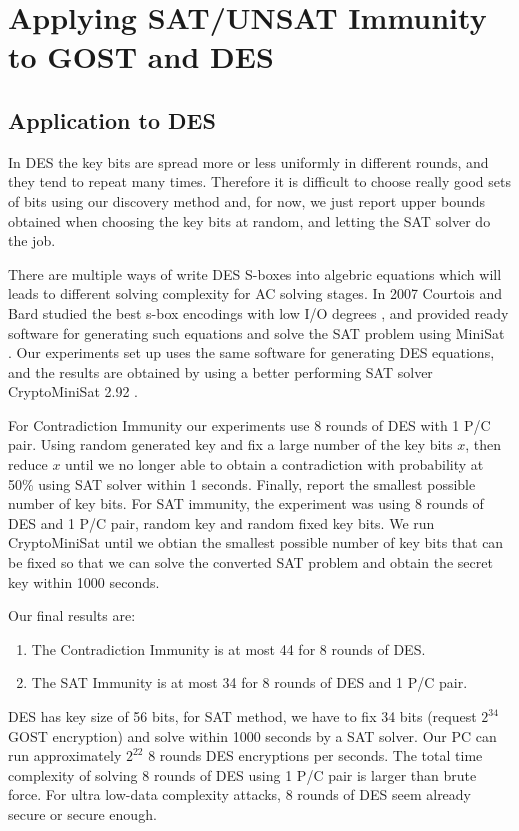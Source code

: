 \section{Applying SAT/UNSAT Immunity to GOST and DES}

\subsection{Application to DES}
 In DES the key bits are spread more or less uniformly in different rounds, and they tend to repeat many times. Therefore it is difficult to choose really good sets of bits using our discovery method and, for now, we just report upper bounds obtained when choosing
the key bits at random, and letting the SAT solver do the job. 

There are multiple ways of write DES S-boxes into algebric equations which will leads to different solving complexity for AC solving stages. In 2007 Courtois and Bard studied the best s-box encodings with low I/O degrees \cite{courtois2007algebraicDES}, and provided ready software for generating such equations and solve the SAT problem using MiniSat \cite{minisat}. Our experiments set up uses the same software for generating DES equations, and the results are obtained by using a better performing SAT solver CryptoMiniSat 2.92 \cite{CryptoMiniSat}.

For Contradiction Immunity our experiments use 8 rounds of DES with 1 P/C pair. Using random generated key and fix a large number of the key bits $x$, then reduce $x$ until we no longer able to obtain a contradiction with probability at 50\% using SAT solver within 1 seconds. Finally, report the smallest possible number of key bits. For SAT immunity, the experiment was using 8 rounds of DES and 1 P/C pair, random key and random fixed key bits. We run CryptoMiniSat until we obtian the smallest possible number of key bits that can be fixed so that we can solve the converted SAT problem and obtain the secret key within 1000 seconds.

Our final results are:
\begin{enumerate}
	\item The Contradiction Immunity
	is at most 44 for 8 rounds of DES.
	\item
	The SAT Immunity
	is at most 34 for 8 rounds of DES and 1 P/C pair.
\end{enumerate}

DES has key size of 56 bits, for SAT method, we have to fix 34 bits (request $2^{34}$ GOST encryption) and solve within 1000 seconds by a SAT solver. Our PC can run approximately $2^{22}$ 8 rounds DES encryptions per seconds. The total time complexity of solving 8 rounds of DES using 1 P/C pair is larger than brute force. For ultra low-data complexity attacks, 8 rounds of DES seem already secure or secure enough.

